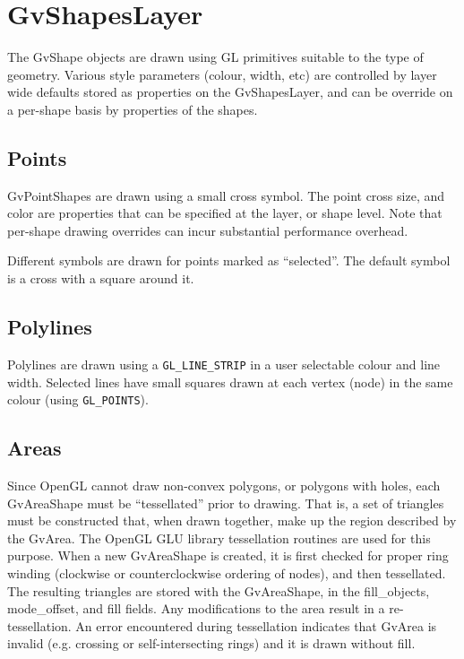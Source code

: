 \documentclass{openevreport}
\begin{document}
\section{GvShapesLayer}

The GvShape objects are drawn using GL primitives suitable to the type
of geometry.  Various style parameters (colour, width, etc) are controlled
by layer wide defaults stored as properties on the GvShapesLayer, and can
be override on a per-shape basis by properties of the shapes. 

\subsection{Points}

GvPointShapes are drawn using a small cross symbol.  The point cross size, 
and color are properties that can be specified at the layer, or shape level.
Note that per-shape drawing overrides can incur substantial performance
overhead.

Different symbols are drawn for points marked as ``selected''.  The
default symbol is a cross with a square around it.

\subsection{Polylines}

Polylines are drawn using a \texttt{GL\_LINE\_STRIP} in a user
selectable colour and line width.  Selected lines have small squares drawn at 
each vertex (node) in the same colour (using \texttt{GL\_POINTS}).

\subsection{Areas}

Since OpenGL cannot draw non-convex polygons, or polygons with holes,
each GvAreaShape must be ``tessellated'' prior to drawing.  That is, a set
of triangles must be constructed that, when drawn together, make up
the region described by the GvArea.  The OpenGL GLU library
tessellation routines are used for this purpose.  When a new GvAreaShape is
created, it is first checked for proper ring winding (clockwise or
counterclockwise ordering of nodes), and then tessellated.  The
resulting triangles are stored with the GvAreaShape, in the fill\_objects, 
mode\_offset, and fill fields.  Any modifications to
the area result in a re-tessellation.  An error encountered during
tessellation indicates that GvArea is invalid (e.g. crossing or
self-intersecting rings) and it is drawn without fill.
\end{document}
